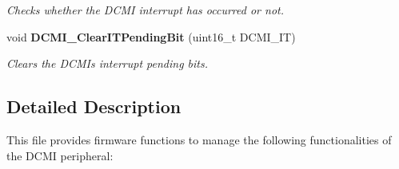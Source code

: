 \begin{DoxyCompactItemize}
\begin{DoxyCompactList}\small\item\em Checks whether the D\+C\+MI interrupt has occurred or not. \end{DoxyCompactList}\item 
void \textbf{ D\+C\+M\+I\+\_\+\+Clear\+I\+T\+Pending\+Bit} (uint16\+\_\+t D\+C\+M\+I\+\_\+\+IT)
\begin{DoxyCompactList}\small\item\em Clears the D\+C\+MI\textquotesingle{}s interrupt pending bits. \end{DoxyCompactList}\end{DoxyCompactItemize}


\subsection{Detailed Description}
This file provides firmware functions to manage the following functionalities of the D\+C\+MI peripheral\+: 

